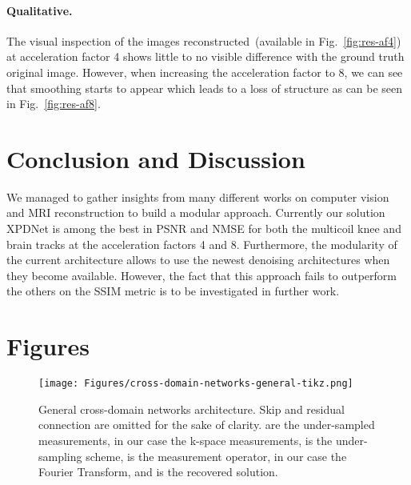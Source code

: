 \documentclass{article}
\begin{document}
\paragraph{Qualitative.}
The visual inspection of the images reconstructed~(available in Fig.~\ref{fig:res-af4}) at acceleration factor 4 shows little to no visible difference with the ground truth original image.
However, when increasing the acceleration factor to 8, we can see that smoothing starts to appear which leads to a loss of structure as can be seen in Fig.~\ref{fig:res-af8}.

\section{Conclusion and Discussion}
We managed to gather insights from many different works on computer vision and MRI reconstruction to build a modular approach.
Currently our solution XPDNet is among the best in PSNR and NMSE for both the multicoil knee and brain tracks at the acceleration factors 4 and 8.
Furthermore, the modularity of the current architecture allows to use the newest denoising architectures when they become available.
However, the fact that this approach fails to outperform the others on the SSIM metric is to be investigated in further work.

\section{Figures}

\begin{figure}[h]
\centering
\texttt{[image: Figures/cross-domain-networks-general-tikz.png]}
\caption{
\label{fig:cd-net} 
General cross-domain networks architecture. Skip and residual connection are omitted for the sake of clarity.  are the under-sampled measurements, in our case the k-space measurements,  is the under-sampling scheme,  is the measurement operator, in our case the Fourier Transform, and  is the recovered solution.
}
\end{figure}
\end{document}
